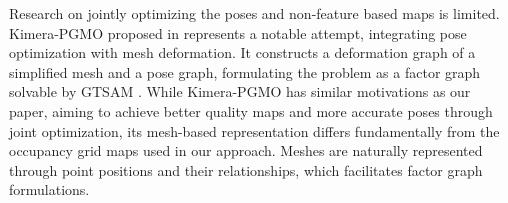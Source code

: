 

Research on jointly optimizing the poses and non-feature based maps is limited. Kimera-PGMO proposed in \cite{rosinol2021kimera} represents a notable attempt, integrating pose optimization with mesh deformation. It constructs a deformation graph of a simplified mesh and a pose graph, formulating the problem as a factor graph solvable by GTSAM \cite{dellaert2012factor}. 
While Kimera-PGMO \cite{rosinol2021kimera} has similar motivations as our paper, aiming to achieve better quality maps and more accurate poses through joint optimization, its mesh-based representation differs fundamentally from the occupancy grid maps used in our approach. Meshes are naturally represented through point positions and their relationships, which facilitates factor graph formulations.



